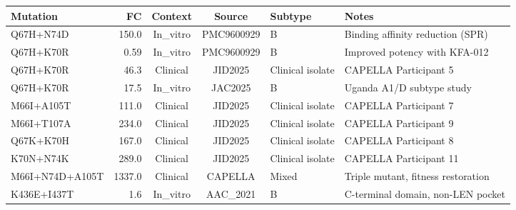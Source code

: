 {\setlength{\tabcolsep}{4pt}%
\footnotesize
\begin{tabular}{lrccll}
\toprule
\textbf{Mutation} & \textbf{FC} & \textbf{Context} & \textbf{Source} & \textbf{Subtype} & \textbf{Notes} \\
\midrule
Q67H+N74D   & 150.0  & In\_vitro & PMC9600929 & B             & Binding affinity reduction (SPR) \\
Q67H+K70R   & 0.59   & In\_vitro & PMC9600929 & B             & Improved potency with KFA-012 \\
Q67H+K70R   & 46.3   & Clinical & JID2025    & Clinical isolate & CAPELLA Participant 5 \\
Q67H+K70R   & 17.5   & In\_vitro & JAC2025    & B             & Uganda A1/D subtype study \\
M66I+A105T  & 111.0  & Clinical & JID2025    & Clinical isolate & CAPELLA Participant 7 \\
M66I+T107A  & 234.0  & Clinical & JID2025    & Clinical isolate & CAPELLA Participant 9 \\
Q67K+K70H   & 167.0  & Clinical & JID2025    & Clinical isolate & CAPELLA Participant 8 \\
K70N+N74K   & 289.0  & Clinical & JID2025    & Clinical isolate & CAPELLA Participant 11 \\
M66I+N74D+A105T & 1337.0 & Clinical & CAPELLA & Mixed & Triple mutant, fitness restoration \\
K436E+I437T & 1.6    & In\_vitro & AAC\_2021  & B             & C-terminal domain, non-LEN pocket \\
\bottomrule
\end{tabular}
}